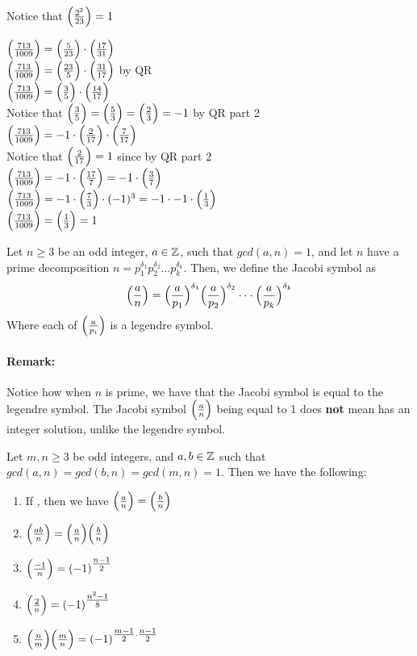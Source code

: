 \documentclass[../main.tex]{subfiles}
\begin{document}
\begin{ans}[cont.]
    Notice that $\Big(\frac{2^2}{23}\Big)=1$
    \begin{center}
        $\Big(\frac{713}{1009}\Big)=\Big(\frac{5}{23}\Big)\cdot \Big(\frac{17}{31}\Big)$ \\
        $\Big(\frac{713}{1009}\Big)=\Big(\frac{23}{5}\Big) \cdot \Big(\frac{31}{17}\Big)$ by QR \\
        $\Big(\frac{713}{1009}\Big)=\Big(\frac{3}{5}\Big)\cdot\Big(\frac{14}{17}\Big)$ \\
        Notice that $\Big(\frac{3}{5}\Big)=\Big(\frac{5}{3}\Big)=\Big(\frac{2}{3}\Big)=-1$ by QR part 2 \\
        $\Big(\frac{713}{1009}\Big)=-1\cdot\Big(\frac{2}{17}\Big)\cdot\Big(\frac{7}{17}\Big)$ \\
        Notice that $\Big(\frac{2}{17}\Big)=1$ since  by QR part 2 \\
        $\Big(\frac{713}{1009}\Big)=-1\cdot\Big(\frac{17}{7}\Big)=-1\cdot\Big(\frac{3}{7}\Big)$ \\
        $\Big(\frac{713}{1009}\Big)=-1\cdot\Big(\frac{7}{3}\Big)\cdot(-1)^3=-1\cdot-1\cdot\Big(\frac{1}{3}\Big)$ \\
        $\Big(\frac{713}{1009}\Big)=\Big(\frac{1}{3}\Big)=1$
    \end{center}
\end{ans}

\begin{defn}
    Let $n \geq 3$ be an odd integer, $a \in \mathbb{Z}$, such that $gcd(a,n)=1$, and let $n$ have a prime decomposition $n = p_1^{\delta_1}p_2^{\delta_2}...p_k^{\delta_k}$. Then, we define the Jacobi symbol as $$\Big(\frac{a}{n}\Big)=\Big(\frac{a}{p_1}\Big)^{\delta_1}\Big(\frac{a}{p_2}\Big)^{\delta_2}\cdot\cdot\cdot\Big(\frac{a}{p_k}\Big)^{\delta_k}$$ Where each of $\Big(\frac{a}{p_i}\Big)$ is a legendre symbol.
\end{defn}

\paragraph{Remark:} Notice how when $n$ is prime, we have that the Jacobi symbol is equal to the legendre symbol. The Jacobi symbol $\Big(\frac{a}{n}\Big)$ being equal to 1 does \textbf{not} mean  has an integer solution, unlike the legendre symbol.

\begin{thm}
    Let $m,n \geq 3$ be odd integers, and $a,b \in \mathbb{Z}$ such that $gcd(a,n)=gcd(b,n)=gcd(m,n)=1$. Then we have the following:
    \begin{enumerate}
        \item If , then we have $\Big(\frac{a}{n}\Big)=\Big(\frac{b}{n}\Big)$
        \item $\Big(\frac{ab}{n}\Big)=\Big(\frac{a}{n}\Big)\Big(\frac{b}{n}\Big)$
        \item $\Big(\frac{-1}{n}\Big)=(-1)^{\tfrac{n-1}{2}}$
        \item $\Big(\frac{2}{n}\Big)=(-1)^{\tfrac{n^2-1}{8}}$
        \item $\Big(\frac{n}{m}\Big)\Big(\frac{m}{n}\Big)=(-1)^{\tfrac{m-1}{2}\cdot\tfrac{n-1}{2}}$
    \end{enumerate}
\end{thm}
\end{document}
